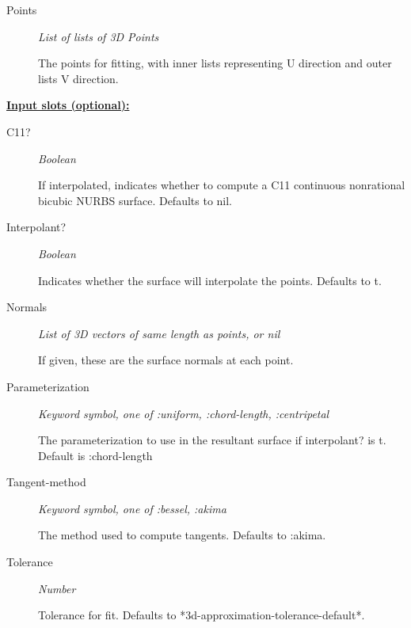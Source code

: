 \documentclass [11pt]{book}
\begin{document}
\begin{itemize}
\begin{description}
\item [Points]
\emph{List of lists of 3D Points}

 The points for fitting, with inner lists representing U direction and outer lists V direction.




\end{description}






\textbf{
\underline{Input slots (optional):}}

\begin{description}

\item [C11?]
\emph{Boolean}

 If interpolated, indicates whether to compute a C11 continuous nonrational bicubic NURBS surface. Defaults to nil.




\item [Interpolant?]
\emph{Boolean}

 Indicates whether the surface will interpolate the points. Defaults to t.




\item [Normals]
\emph{List of 3D vectors of same length as points, or nil}

 If given, these are the surface normals at each point.




\item [Parameterization]
\emph{Keyword symbol, one of :uniform, :chord-length, :centripetal}

 The parameterization to use in the resultant surface if
interpolant? is t. Default is :chord-length




\item [Tangent-method]
\emph{Keyword symbol, one of :bessel, :akima}

  The method used to compute tangents. Defaults to :akima.




\item [Tolerance]
\emph{Number}

 Tolerance for fit. Defaults to *3d-approximation-tolerance-default*.





\end{description}
\end{itemize}
\end{document}
